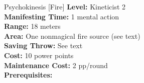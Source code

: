 {Psychokinesis [Fire]}
{
	\textbf{Level:}
	Kineticist 2\\
	\textbf{Manifesting Time:}
	1 mental action\\
	\textbf{Range:}
	18 meters\\
	\textbf{Area:}
	One nonmagical fire source (see text)\\
	\textbf{Saving Throw:}
	See text\\
	\textbf{Cost:}
	10 power points\\
	\textbf{Maintenance Cost:}
	2 pp/round\\
	\textbf{Prerequisites:}
	\\
}
